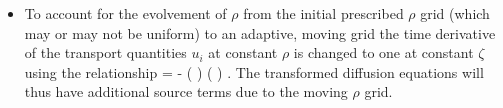 \begin{itemize}
 \item To account for the evolvement of $\rho$ from the initial prescribed
 $\rho$ grid (which may or  may not be uniform) to an adaptive, moving grid the
 time derivative of the transport quantities $u_i$ at constant $\rho$ is changed
 to one at constant $\zeta$ using the relationship 
 \beq
  \pmb{\bigg \vert_\rho} = 
   \pmb{\bigg \vert_\zeta} 
  -   \bigg (  \bigg ) 
  \bigg(\pmb{\bigg \vert_\zeta} \bigg ) .
 \eeq 
 The transformed  diffusion equations will thus have additional source terms due
 to the moving $\rho$ grid.
\end{itemize}
